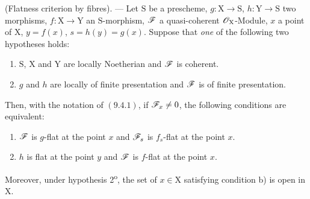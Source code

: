 \begin{theorem}[11.3.10]
\label{IV.11.3.10}
(Flatness criterion by fibres). --- Let $\mathrm{S}$ be a prescheme, $g:\mathrm{X}\to\mathrm{S}$, $h:\mathrm{Y}\to\mathrm{S}$ two morphisms, $f:\mathrm{X}\to\mathrm{Y}$ an $\mathrm{S}$-morphism, $\mathscr{F}$ a quasi-coherent $\mathscr{O}_\mathrm{X}$-Module, $x$ a point of $\mathrm{X}$, $y=f(x)$, $s=h(y)=g(x)$. Suppose that \emph{one} of the following two hypotheses holds:
\begin{enumerate}[label=\textup{\arabic{enumi}\textsuperscript{o}}]
  \item $\mathrm{S}$, $\mathrm{X}$ and $\mathrm{Y}$ are locally Noetherian and $\mathscr{F}$ is coherent.
  \item $g$ and $h$ are locally of finite presentation and $\mathscr{F}$ is of finite presentation.
\end{enumerate}
Then, with the notation of $(9.4.1)$, if $\mathscr{F}_x\neq 0$, the following conditions are equivalent:
\begin{enumerate}[label=\emph{\alph*)}]
  \item $\mathscr{F}$ is $g$-flat at the point $x$ and $\mathscr{F}_s$ is $f_s$-flat at the point $x$.
  \item $h$ is flat at the point $y$ and $\mathscr{F}$ is $f$-flat at the point $x$.
\end{enumerate}
Moreover, under hypothesis \textup{2\textsuperscript{o}}, the set of $x\in\mathrm{X}$ satisfying condition \textup{b)} is open in $\mathrm{X}$.
\end{theorem}

